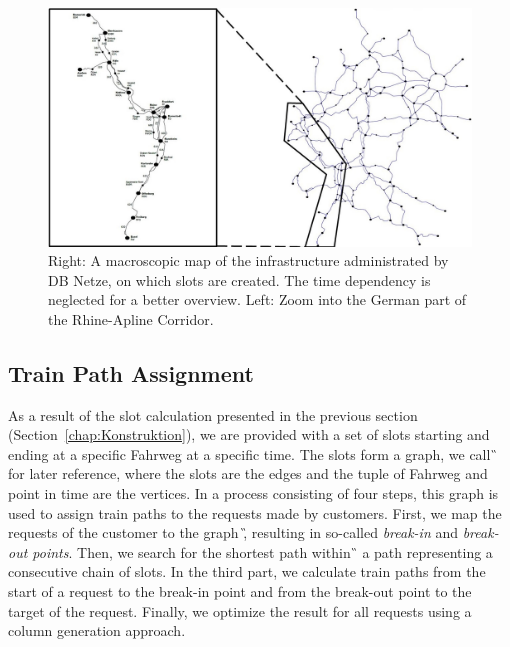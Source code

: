 %
\begin{figure}[tb]
	\centering
	\includegraphics[scale=0.3]{Bilder/D-Karte+Zoom.jpg}
	\caption{Right: A macroscopic map of the infrastructure administrated by DB Netze, on which slots are created. The time dependency is neglected for a better overview. Left: Zoom into the German part of the Rhine-Apline Corridor.}
	\label{fig:STAKarte}
\end{figure}


\subsection{Train Path Assignment}
\label{chap:Belegung}
%
As a result of the slot calculation presented in the previous section (Section~\ref{chap:Konstruktion}), we are provided with a set of slots starting and ending at a specific Fahrweg at a specific time. The slots form a graph, we call \G\, for later reference, where the slots are the edges and the tuple of Fahrweg and point in time are the vertices. In a process consisting of four steps, this graph is used to assign train paths to the requests made by customers. First, we map the requests of the customer to the graph \G, resulting in so-called \emph{break-in} and \emph{break-out points}. Then, we search for the shortest path within \G\, a path representing a consecutive chain of slots. In the third part, we calculate train paths from the start of a request to the break-in point and from the break-out point to the target of the request. Finally, we optimize the result for all requests using a column generation approach.

